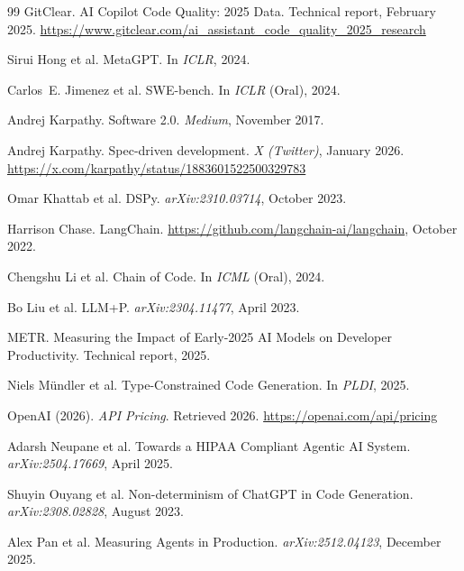 \documentclass[11pt]{article}
\begin{document}
\begin{thebibliography}{99}
GitClear. AI Copilot Code Quality: 2025 Data. Technical report, February 2025.
\newblock \url{https://www.gitclear.com/ai_assistant_code_quality_2025_research}

Sirui Hong et al. MetaGPT. In \emph{ICLR}, 2024.

Carlos~E. Jimenez et al. SWE-bench. In \emph{ICLR} (Oral), 2024.

Andrej Karpathy. Software 2.0. \emph{Medium}, November 2017.

Andrej Karpathy. Spec-driven development. \emph{X (Twitter)}, January 2026.
\newblock \url{https://x.com/karpathy/status/1883601522500329783}

Omar Khattab et al. DSPy. \emph{arXiv:2310.03714}, October 2023.

Harrison Chase. LangChain. \url{https://github.com/langchain-ai/langchain}, October 2022.

Chengshu Li et al. Chain of Code. In \emph{ICML} (Oral), 2024.

Bo Liu et al. LLM+P. \emph{arXiv:2304.11477}, April 2023.

METR. Measuring the Impact of Early-2025 AI Models on Developer Productivity. Technical report, 2025.

Niels M\"{u}ndler et al. Type-Constrained Code Generation. In \emph{PLDI}, 2025.

OpenAI (2026). \textit{API Pricing}. Retrieved 2026. \url{https://openai.com/api/pricing}

Adarsh Neupane et al. Towards a HIPAA Compliant Agentic AI System. \emph{arXiv:2504.17669}, April 2025.

Shuyin Ouyang et al. Non-determinism of ChatGPT in Code Generation. \emph{arXiv:2308.02828}, August 2023.

Alex Pan et al. Measuring Agents in Production. \emph{arXiv:2512.04123}, December 2025.


\end{thebibliography}
\end{document}
